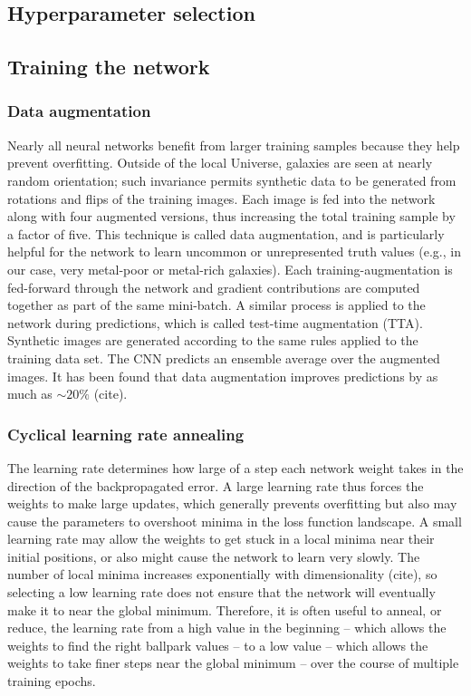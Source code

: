 \documentclass[fleqn,usenatbib]{mnras}
\begin{document}
\subsection{Hyperparameter selection}


\subsection{Training the network}


\subsubsection{Data augmentation}
Nearly all neural networks benefit from larger training samples because they help prevent overfitting.
Outside of the local Universe, galaxies are seen at nearly random orientation; such invariance permits synthetic data to be generated from rotations and flips of the training images.
Each image is fed into the network along with four augmented versions, thus increasing the total training sample by a factor of five.
This technique is called data augmentation, and is particularly helpful for the network to learn uncommon or unrepresented truth values (e.g., in our case, very metal-poor or metal-rich galaxies).
Each training-augmentation is fed-forward through the network and gradient contributions are computed together as part of the same mini-batch.
A similar process is applied to the network during predictions, which is called test-time augmentation (TTA).
Synthetic images are generated according to the same rules applied to the training data set.
The CNN predicts an ensemble average over the augmented images.
It has been found that data augmentation improves predictions by as much as $\sim 20\%$ (cite).

\subsubsection{Cyclical learning rate annealing}
The learning rate determines how large of a step each network weight takes in the direction of the backpropagated error.
A large learning rate thus forces the weights to make large updates, which generally prevents overfitting but also may cause the parameters to overshoot minima in the loss function landscape.
A small learning rate may allow the weights to get stuck in a local minima near their initial positions, or also might cause the network to learn very slowly.
The number of local minima increases exponentially with dimensionality (cite), so selecting a low learning rate does not ensure that the network will eventually make it to near the global minimum.
Therefore, it is often useful to anneal, or reduce, the learning rate from a high value in the beginning -- which allows the weights to find the right ballpark values -- to a low value -- which allows the weights to take finer steps near the global minimum -- over the course of multiple training epochs.
\end{document}
